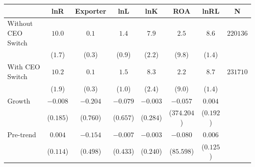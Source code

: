 \begin{tabular}{lccccccc}
\hline\hline
 & lnR & Exporter & lnL & lnK & ROA & lnRL & N \\
\hline
Without CEO Switch & $10.0$ & $0.1$ & $1.4$ & $7.9$ & $2.5$ & $8.6$ & $220136$ \\
 & ($1.7$) & ($0.3$) & ($0.9$) & ($2.2$) & ($9.8$) & ($1.4$) &  \\
With CEO Switch & $10.2$ & $0.1$ & $1.5$ & $8.3$ & $2.2$ & $8.7$ & $231710$ \\
 & ($1.9$) & ($0.3$) & ($1.0$) & ($2.4$) & ($9.0$) & ($1.4$) &  \\
Growth & $-0.008$ & $-0.204$ & $-0.079$ & $-0.003$ & $-0.057$ & $0.004$ &  \\
 & ($0.185$) & ($0.760$) & ($0.657$) & ($0.284$) & ($374.204$) & ($0.192$) &  \\
Pre-trend & $0.004$ & $-0.154$ & $-0.007$ & $-0.003$ & $-0.080$ & $0.006$ &  \\
 & ($0.114$) & ($0.498$) & ($0.433$) & ($0.240$) & ($85.598$) & ($0.125$) &  \\
\hline\hline
\end{tabular}

